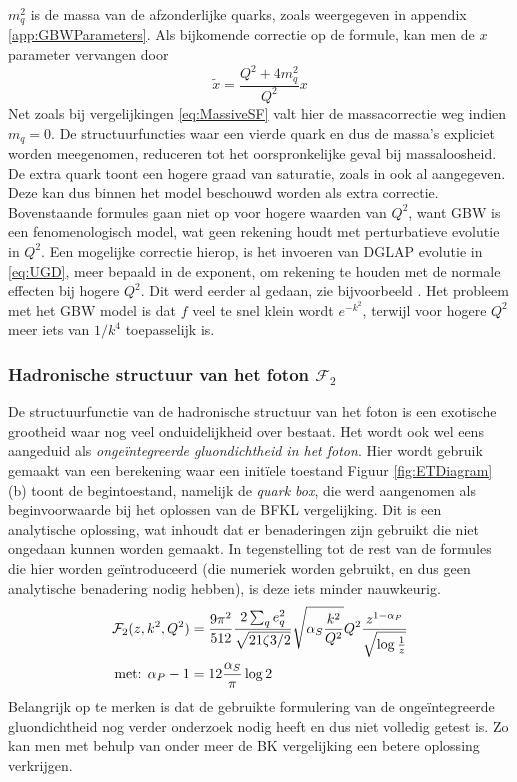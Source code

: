 \documentclass[a4paper,11pt]{article}
\numberwithin{equation}{section} %
\begin{document}
$m_q^2$ is de massa van de afzonderlijke quarks, zoals weergegeven in appendix \ref{app:GBWParameters}.
Als bijkomende correctie op de formule, kan men de $x$ parameter vervangen door
\begin{equation}
\tilde{x} = \frac{Q^2+ 4 m_q^2}{Q^2} x 
\end{equation}
Net zoals bij vergelijkingen \eqref{eq:MassiveSF} valt hier de massacorrectie weg indien $m_q=0$.
De structuurfuncties waar een vierde quark en dus de massa’s expliciet worden meegenomen, reduceren tot het oorspronkelijke geval bij massaloosheid.
De extra quark toont een hogere graad van saturatie, zoals in \cite{GBW} ook al aangegeven.
Deze kan dus binnen het model beschouwd worden als extra correctie.
Bovenstaande formules gaan niet op voor hogere waarden van $Q^2$, want GBW is een fenomenologisch model, wat geen rekening houdt met perturbatieve evolutie in $Q^2$.
Een mogelijke correctie hierop, is het invoeren van DGLAP evolutie in \eqref{eq:UGD}, meer bepaald in de exponent, om rekening te houden met de normale effecten bij hogere $Q^2$.
Dit werd eerder al gedaan, zie bijvoorbeeld \cite{Bartels}.
Het probleem met het GBW model is dat $f$ veel te snel klein wordt $e^{-k^2}$, terwijl voor hogere $Q^2$ meer iets van $1/k^4$ toepasselijk is.

    \subsubsection{Hadronische structuur van het foton $\mathcal{F}_2$} \label{sec:UGDPhoton}
De structuurfunctie van de hadronische structuur van het foton is een exotische grootheid waar nog veel onduidelijkheid over bestaat.
Het wordt ook wel eens aangeduid als \textit{ongeïntegreerde gluondichtheid in het foton}.
Hier wordt gebruik gemaakt van een berekening waar een initïele toestand
Figuur \ref{fig:ETDiagram} (b) toont de begintoestand, namelijk de \textit{quark box}, die werd aangenomen als beginvoorwaarde bij het oplossen van de BFKL vergelijking.
Dit is een analytische oplossing, wat inhoudt dat er benaderingen zijn gebruikt die niet ongedaan kunnen worden gemaakt.
In tegenstelling tot de rest van de formules die hier worden geïntroduceerd (die numeriek worden gebruikt, en dus geen analytische benadering nodig hebben), is deze iets minder nauwkeurig.
\begin{align} \label{eq:UGDPhoton}
\mathcal{F}_2(z,k^2,Q^2) &= \frac{9\pi^2}{512} \frac{2\sum_q e_q^2}{\sqrt{21\zeta{3}/2}} \sqrt{\alpha_S \frac{k^2}{Q^2}} Q^2 \frac{z^{1-\alpha_P}}{\sqrt{\log{\frac{1}{z}}}} \\
\text{met: } \alpha_P -1 &=  12  \frac{\alpha_S}{\pi} \log{2} \notag
\end{align}
Belangrijk op te merken is dat de gebruikte formulering van de ongeïntegreerde gluondichtheid nog verder onderzoek nodig heeft en dus niet volledig getest is.
Zo kan men met behulp van onder meer de BK vergelijking een betere oplossing verkrijgen.
\end{document}
